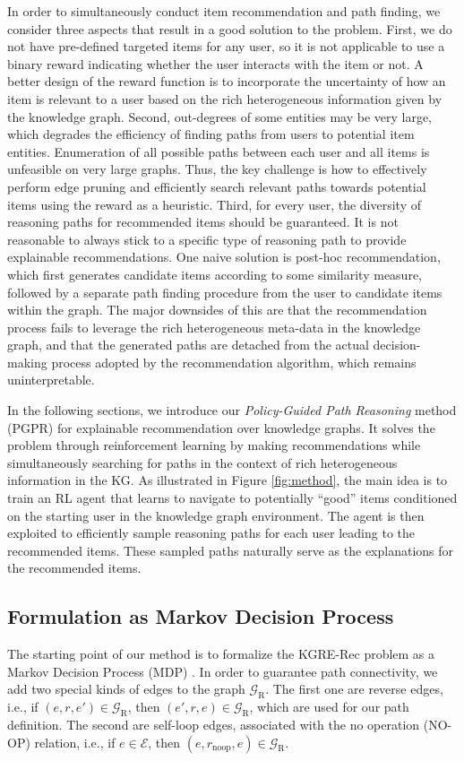 \documentclass[sigconf]{acmart}
\begin{document}
In order to simultaneously conduct item recommendation and path finding, we consider three aspects that result in a good solution to the problem.
First, we do not have pre-defined targeted items for any user, so it is not applicable to use a binary reward indicating whether the user interacts with the item or not. A better design of the reward function is to incorporate the uncertainty of how an item is relevant to a user based on the rich heterogeneous information given by the knowledge graph.
Second, out-degrees of some entities may be very large, which degrades the efficiency of finding paths from users to potential item entities.
Enumeration of all possible paths between each user and all items is unfeasible on very large graphs.
Thus, the key challenge is how to effectively perform edge pruning and efficiently search relevant paths towards potential items using the reward as a heuristic.
Third, for every user, the diversity of reasoning paths for recommended items should be guaranteed. It is not reasonable to always stick to a specific type of reasoning path to provide explainable recommendations.
One naive solution is post-hoc recommendation, which first generates candidate items according to some similarity measure, followed by a separate path finding procedure from the user to candidate items within the graph.
The major downsides of this are that the recommendation process fails to leverage the rich heterogeneous meta-data in the knowledge graph, 
and that the generated paths are detached from the actual decision-making process adopted by the recommendation algorithm, which remains uninterpretable.

In the following sections, we introduce our \emph{Policy-Guided Path Reasoning} method (PGPR) for explainable recommendation over knowledge graphs.
It solves the problem through reinforcement learning by making recommendations while simultaneously searching for paths in the context of rich heterogeneous information in the KG. As illustrated in Figure \ref{fig:method}, the main idea is to train an RL agent that learns to navigate to potentially ``good'' items conditioned on the starting user in the knowledge graph environment.
The agent is then exploited to efficiently sample reasoning paths for each user leading to the recommended items. These sampled paths naturally serve as the explanations for the recommended items. 

\subsection{Formulation as Markov Decision Process}
The starting point of our method is to formalize the KGRE-Rec problem as a Markov Decision Process (MDP) \cite{sutton2018reinforcement}.
In order to guarantee path connectivity, we add two special kinds of edges to the graph $\mathcal{G}_{\text{R}}$. The first one are reverse edges, i.e., if $(e,r,e')\in\mathcal{G}_{\text{R}}$, then $(e',r,e)\in\mathcal{G}_{\text{R}}$, which are used for our path definition. The second are self-loop edges, associated with the no operation (NO-OP) relation, i.e., if $e\in\mathcal{E}$, then $(e,r_\mathrm{noop},e)\in\mathcal{G}_{\text{R}}$.
\end{document}
